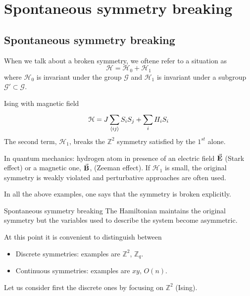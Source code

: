 \documentclass[../main/main.tex]{subfiles}
\begin{document}
\chapter{Spontaneous symmetry breaking}


\section{Spontaneous symmetry breaking}

When we talk about a broken symmetry, we oftene refer to a situation as
\begin{equation}
  \mathcal{H} = \mathcal{H}_0 + \mathcal{H}_1
\end{equation}
where \( \mathcal{H}_0 \)  is invariant under the group \( \mathcal{G} \) and \( \mathcal{H}_1 \) is invariant under a subgroup \( \mathcal{G}' \subset  \mathcal{G}\).
\begin{example}{Ising with magnetic field}{}
\begin{equation}
  \mathcal{H} = J \sum_{\expval{ij} }^{} S_i S_j + \sum_{i}^{} H_i S_i
\end{equation}
The second term, \( \mathcal{H}_1 \), breaks the \( \mathbb{Z}^2 \) symmetry satisfied by the \( 1^{st} \) alone.
\end{example}
\begin{example}{}{}
In quantum mechanics: hydrogen atom in presence of an electric field \( \va{E} \) (Stark effect) or a magnetic one, \( \va{B} \), (Zeeman effect). If \( \mathcal{H}_1 \) is small, the original symmetry is weakly violated and perturbative approaches are often used.
\end{example}

In all the above examples, one says that the symmetry is broken explicitly.

\begin{definition}{Spontaneous symmetry breaking}{}
The Hamiltonian maintains the original symmetry but the variables used to describe the system become asymmetric.
\end{definition}
At this point it is convenient to distinguish between
\begin{itemize}
\item Discrete symmetries: examples are \( \mathbb{Z}^2 \), \( \mathbb{Z}_q \).
\item Continuous symmetries: examples are \( xy \), \( O(n) \).
\end{itemize}
Let us consider first the discrete ones by focusing on \( \mathbb{Z}^2 \) (Ising).
\end{document}
